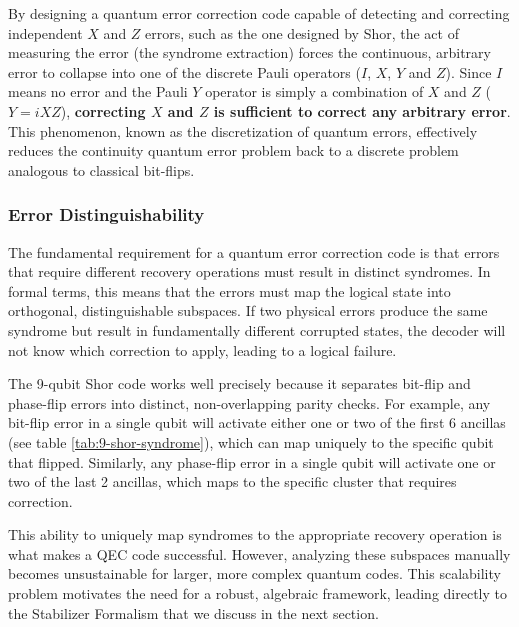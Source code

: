 By designing a quantum error correction code capable of detecting and correcting independent $X$ and $Z$ errors, such as the one designed by Shor, the act of measuring the error (the syndrome extraction) forces the continuous, arbitrary error to collapse into one of the discrete Pauli operators ($I$, $X$, $Y$ and $Z$). Since $I$ means no error and the Pauli $Y$ operator is simply a combination of $X$ and $Z$ ($Y = iXZ$), \textbf{correcting $X$ and $Z$ is sufficient to correct any arbitrary error}. This phenomenon, known as the discretization of quantum errors, effectively reduces the continuity quantum error problem back to a discrete problem analogous to classical bit-flips.

\subsubsection*{Error Distinguishability}
\label{sec:distinguishability}

The fundamental requirement for a quantum error correction code is that errors that require different recovery operations must result in distinct syndromes. In formal terms, this means that the errors must map the logical state into orthogonal, distinguishable subspaces. If two physical errors produce the same syndrome but result in fundamentally different corrupted states, the decoder will not know which correction to apply, leading to a logical failure.

The 9-qubit Shor code works well precisely because it separates bit-flip and phase-flip errors into distinct, non-overlapping parity checks. For example, any bit-flip error in a single qubit will activate either one or two of the first 6 ancillas (see table \ref{tab:9-shor-syndrome}), which can map uniquely to the specific qubit that flipped. Similarly, any phase-flip error in a single qubit will activate one or two of the last 2 ancillas, which maps to the specific cluster that requires correction.

This ability to uniquely map syndromes to the appropriate recovery operation is what makes a QEC code successful. However, analyzing these subspaces manually becomes unsustainable for larger, more complex quantum codes. This scalability problem motivates the need for a robust, algebraic framework, leading directly to the Stabilizer Formalism that we discuss in the next section.

